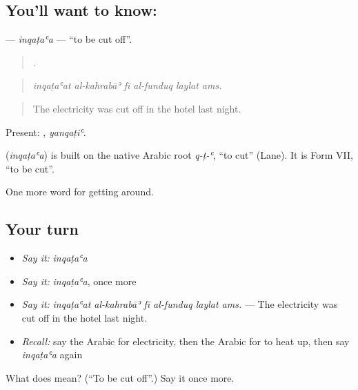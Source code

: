 \subsection*{You'll want to know: }
\textbf{} — \emph{inqaṭaʿa} — \textquotedblleft{}to be cut off\textquotedblright{}.

\begin{quote}
     .
\end{quote}

\begin{quote}
\emph{inqaṭaʿat al-kahrabāʾ fī al-funduq laylat ams.}
\end{quote}

\begin{quote}
The electricity was cut off in the hotel last night.
\end{quote}

Present: , \emph{yanqaṭiʿ}.

\begin{cousinweb}
\textbf{} (\emph{inqaṭaʿa}) is built on the native Arabic root \emph{q-ṭ-ʿ}, \textquotedblleft{}to cut\textquotedblright{} (Lane). It is Form VII, \textquotedblleft{}to be cut\textquotedblright{}.
\end{cousinweb}

\begin{grammarlens}[title={What you've built}]
One more word for getting around.
\end{grammarlens}

\subsection*{Your turn}
\begin{itemize}
\raggedright
  \item \emph{Say it:} \emph{inqaṭaʿa}
  \item \emph{Say it:} \emph{inqaṭaʿa}, once more
  \item \emph{Say it:} \emph{inqaṭaʿat al-kahrabāʾ fī al-funduq laylat ams.} — The electricity was cut off in the hotel last night.
  \item \emph{Recall:} say the Arabic for electricity, then the Arabic for to heat up, then say \emph{inqaṭaʿa} again
\end{itemize}

\begin{tcolorbox}[breakable,colback=teal!4,colframe=teal!35!black,title={Before you move on}]
What does  mean? (\textquotedblleft{}To be cut off\textquotedblright{}.) Say it once more.
\end{tcolorbox}
